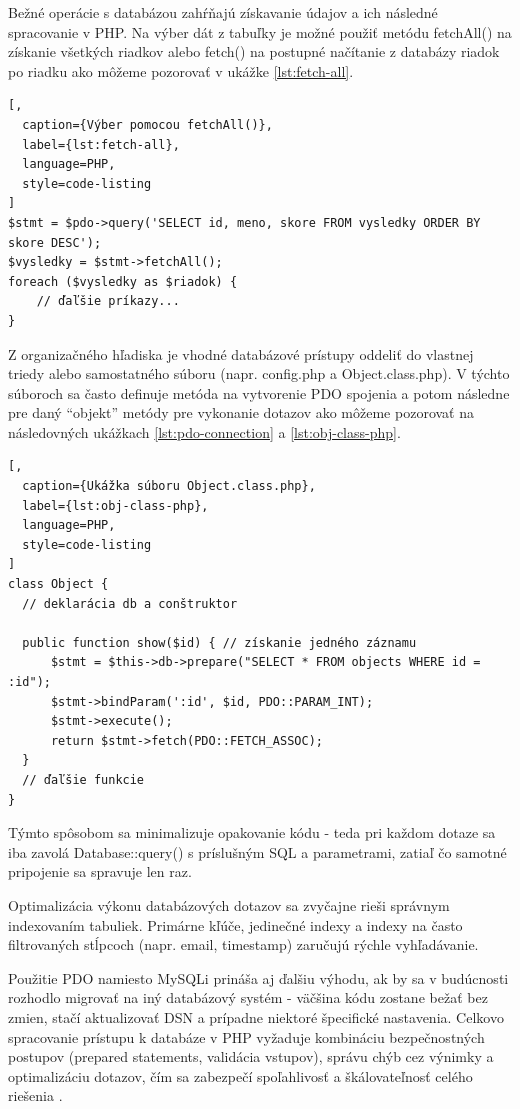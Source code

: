 Bežné operácie s databázou zahŕňajú získavanie údajov a ich následné spracovanie v PHP. Na výber dát z tabuľky je možné použiť metódu 
fetchAll() na získanie všetkých riadkov alebo fetch() na postupné načítanie z databázy riadok po riadku ako môžeme pozorovať v 
ukážke \ref{lst:fetch-all}.

\begin{lstlisting}[,
  caption={Výber pomocou fetchAll()},
  label={lst:fetch-all},
  language=PHP,
  style=code-listing
]
$stmt = $pdo->query('SELECT id, meno, skore FROM vysledky ORDER BY skore DESC');
$vysledky = $stmt->fetchAll();
foreach ($vysledky as $riadok) {
    // ďaľšie príkazy...
}
\end{lstlisting}

Z organizačného hľadiska je vhodné databázové prístupy oddeliť do vlastnej triedy alebo samostatného súboru 
(napr. config.php a Object.class.php). V týchto súboroch sa často definuje metóda na vytvorenie PDO spojenia 
a potom následne pre daný ``objekt'' metódy pre vykonanie dotazov ako môžeme pozorovať na následovných ukážkach 
\ref{lst:pdo-connection} a \ref{lst:obj-class-php}.

\begin{lstlisting}[,
  caption={Ukážka súboru Object.class.php},
  label={lst:obj-class-php},
  language=PHP,
  style=code-listing
]
class Object {
  // deklarácia db a conštruktor

  public function show($id) { // získanie jedného záznamu
      $stmt = $this->db->prepare("SELECT * FROM objects WHERE id = :id");
      $stmt->bindParam(':id', $id, PDO::PARAM_INT);
      $stmt->execute();
      return $stmt->fetch(PDO::FETCH_ASSOC);
  }
  // ďaľšie funkcie
}
\end{lstlisting}

Týmto spôsobom sa minimalizuje opakovanie kódu - teda pri každom dotaze sa iba zavolá Database::query() s 
príslušným SQL a parametrami, zatiaľ čo samotné pripojenie sa spravuje len raz.

Optimalizácia výkonu databázových dotazov sa zvyčajne rieši správnym indexovaním tabuliek. Primárne kľúče, jedinečné 
indexy a indexy na často filtrovaných stĺpcoch (napr. email, timestamp) zaručujú rýchle vyhľadávanie.

Použitie PDO namiesto MySQLi prináša aj ďalšiu výhodu, ak by sa v budúcnosti rozhodlo migrovať na iný databázový systém - väčšina 
kódu zostane bežať bez zmien, stačí aktualizovať DSN a prípadne niektoré špecifické nastavenia. Celkovo spracovanie prístupu k 
databáze v PHP vyžaduje kombináciu bezpečnostných postupov (prepared statements, validácia vstupov), správu chýb cez výnimky a 
optimalizáciu dotazov, čím sa zabezpečí spoľahlivosť a škálovateľnosť celého riešenia \cite{php_manual_pdo}.


